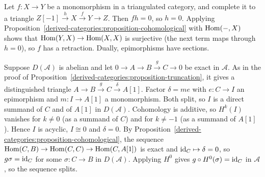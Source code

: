 \begin{solution}
Let $f \colon X \to Y$ be a monomorphism in a triangulated category, and complete it to a triangle $Z[-1] \xrightarrow{h} X \xrightarrow{f} Y \to Z$. Then
$fh = 0$, so $h = 0$. Applying Proposition~\ref{derived-categories:proposition-cohomological} with $\operatorname{Hom}(-, X)$ shows that
$\operatorname{Hom}(Y, X) \to \operatorname{Hom}(X, X)$ is surjective (the next term maps through $h = 0$), so $f$ has a retraction. Dually, epimorphisms have sections.

Suppose $D(\mathcal{A})$ is abelian and let $0 \to A \to B \xrightarrow{g} C \to 0$ be exact in $\mathcal{A}$. As in the proof of
Proposition~\ref{derived-categories:proposition-truncation}, it gives a distinguished triangle $A \to B \xrightarrow{g} C \xrightarrow{\delta} A[1]$.
Factor $\delta = me$ with $e \colon C \to I$ an epimorphism and $m \colon I \to A[1]$ a monomorphism. Both split, so $I$ is a direct summand of $C$ and of
$A[1]$ in $D(\mathcal{A})$. Cohomology is additive, so $H^k(I)$ vanishes for $k \neq 0$ (as a summand of $C$) and for $k \neq -1$ (as a summand of $A[1]$).
Hence $I$ is acyclic, $I \cong 0$ and $\delta = 0$. By Proposition~\ref{derived-categories:proposition-cohomological}, the sequence
$\operatorname{Hom}(C, B) \to \operatorname{Hom}(C, C) \to \operatorname{Hom}(C, A[1])$ is exact and $\mathrm{id}_C \mapsto \delta = 0$, so $g\sigma = \mathrm{id}_C$ for some $\sigma \colon C \to B$ in
$D(\mathcal{A})$. Applying $H^0$ gives $g \circ H^0(\sigma) = \mathrm{id}_C$ in $\mathcal{A}$, so the sequence splits.
\end{solution}
